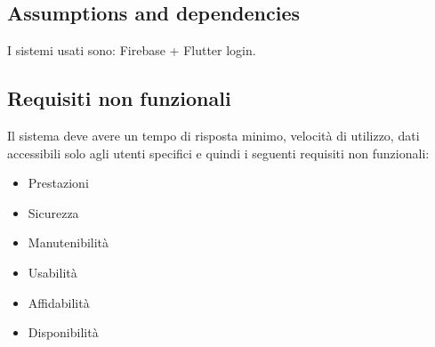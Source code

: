 \documentclass{article}
\begin{document}
\subsection {Assumptions and dependencies} I sistemi usati sono: Firebase + Flutter login.
\subsection {Requisiti non funzionali} 
Il sistema deve avere un tempo di risposta minimo, velocità di utilizzo, dati accessibili solo
agli utenti specifici e quindi i seguenti requisiti non funzionali:
\begin{itemize}
    \item Prestazioni
    \item Sicurezza
    \item Manutenibilità
    \item Usabilità
    \item Affidabilità
    \item Disponibilità
\end{itemize}
\end{document}
